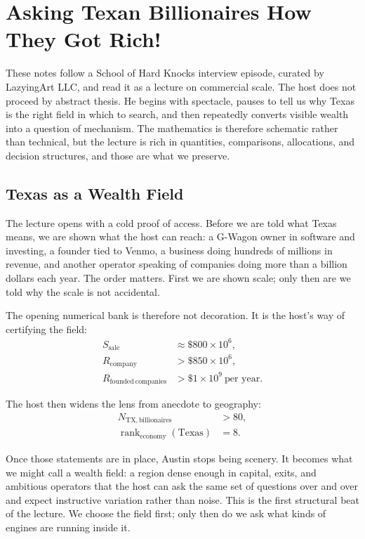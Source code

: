 \chapter{Asking Texan Billionaires How They Got Rich!}

These notes follow a School of Hard Knocks interview episode, curated by LazyingArt LLC, and read it as a lecture on commercial scale. The host does not proceed by abstract thesis. He begins with spectacle, pauses to tell us why Texas is the right field in which to search, and then repeatedly converts visible wealth into a question of mechanism. The mathematics is therefore schematic rather than technical, but the lecture is rich in quantities, comparisons, allocations, and decision structures, and those are what we preserve.

\section{Texas as a Wealth Field}

The lecture opens with a cold proof of access. Before we are told what Texas means, we are shown what the host can reach: a G-Wagon owner in software and investing, a founder tied to Venmo, a business doing hundreds of millions in revenue, and another operator speaking of companies doing more than a billion dollars each year. The order matters. First we are shown scale; only then are we told why the scale is not accidental.

The opening numerical bank is therefore not decoration. It is the host's way of certifying the field:
\begin{align}
S_{\mathrm{sale}} &\approx \$800\times 10^{6},\\
R_{\mathrm{company}} &> \$850\times 10^{6},\\
R_{\mathrm{founded\ companies}} &> \$1\times 10^{9}\ \text{per year}.
\end{align}

The host then widens the lens from anecdote to geography:
\begin{align}
N_{\mathrm{TX,billionaires}} &> 80,\\
\operatorname{rank}_{\mathrm{economy}}(\mathrm{Texas}) &= 8.
\end{align}

Once those statements are in place, Austin stops being scenery. It becomes what we might call a wealth field: a region dense enough in capital, exits, and ambitious operators that the host can ask the same set of questions over and over and expect instructive variation rather than noise. This is the first structural beat of the lecture. We choose the field first; only then do we ask what kinds of engines are running inside it.

